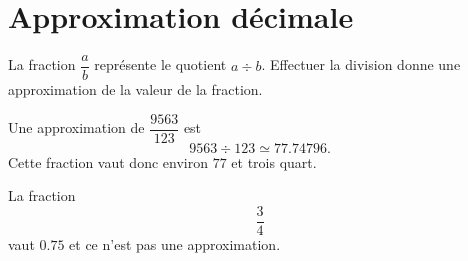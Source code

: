 \section{Approximation décimale}

\begin{Aretenir}
    La fraction \( \dfrac{ a }{ b }\) représente le quotient \( a\div b\). Effectuer la division donne une approximation de la valeur de la fraction.
\end{Aretenir}

\begin{example}
    Une approximation de \( \dfrac{ 9563 }{ 123 }\) est
    \begin{equation}
     9563\div 123\simeq 77.74796.
    \end{equation}
    Cette fraction vaut donc environ \( 77\) et trois quart.
\end{example}

\begin{example}
    La fraction
    \begin{equation}
        \frac{ 3 }{ 4 }
    \end{equation}
    vaut \( 0.75\) et ce n'est pas une approximation.
\end{example}
